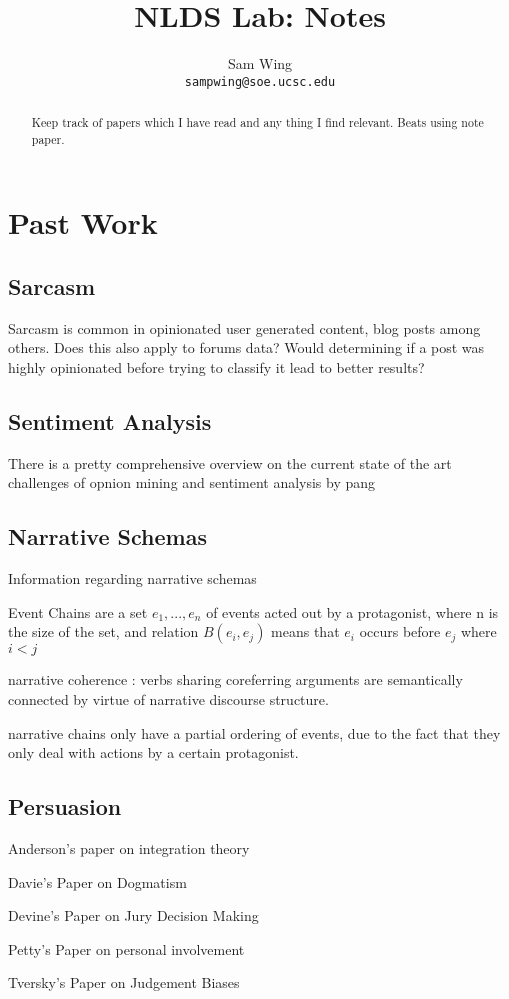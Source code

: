 \documentclass[11pt]{article}
\title{NLDS Lab: Notes}
\author{
	Sam Wing \\
	\texttt{sampwing@soe.ucsc.edu}
}
\date{}                                           %
\begin{document}
\maketitle

\begin{abstract}
Keep track of papers which I have read and any thing I find relevant.  Beats using note paper.
\end{abstract}

\section{Past Work}
\subsection{Sarcasm}
Sarcasm is common in opinionated user generated content, blog posts among others.\cite{icwsm} Does this also apply to forums data?  Would determining if a post was highly opinionated before trying to classify it lead to better results?
\subsection{Sentiment Analysis}
There is a pretty comprehensive overview on the current state of the art challenges of opnion mining and sentiment analysis by pang\cite{pang}

\subsection{Narrative Schemas}
Information regarding narrative schemas\cite{chambers:schemas}

Event Chains\cite{chambers:eventchains} are a set ${e_1, ... , e_n}$ of events acted out by a protagonist, where n is the size of the set, and relation $B(e_i, e_j)$ means that $e_i$ occurs before $e_j$ where $i<j$

narrative coherence : verbs sharing coreferring arguments are semantically connected by virtue of narrative discourse structure.

narrative chains only have a partial ordering of events, due to the fact that they only deal with actions by a certain protagonist.


\subsection{Persuasion}
Anderson's paper on integration theory\cite{anderson:integrationtheory}

Davie's Paper on Dogmatism\cite{davies:dogmatism}

Devine's Paper on Jury Decision Making\cite{devine:jury}

Petty's Paper on personal involvement\cite{petty:personalinvolvement}

Tversky's Paper on Judgement Biases\cite{tversky:judgement}

\pagebreak


\end{document}
